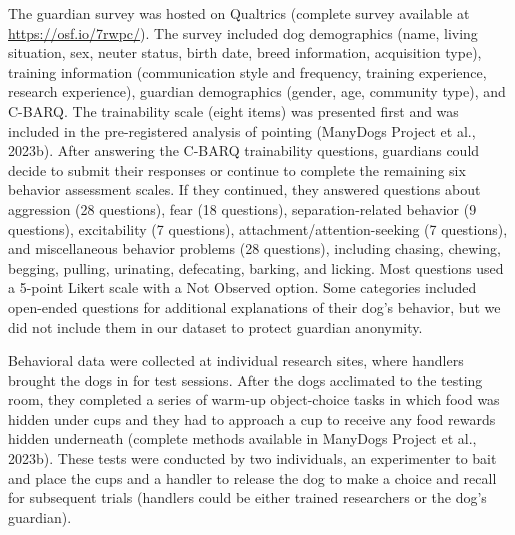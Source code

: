 \documentclass[
  man,floatsintext]{apa6}
\begin{document}
The guardian survey was hosted on Qualtrics (complete survey available at \url{https://osf.io/7rwpc/}). The survey included dog demographics (name, living situation, sex, neuter status, birth date, breed information, acquisition type), training information (communication style and frequency, training experience, research experience), guardian demographics (gender, age, community type), and C-BARQ. The trainability scale (eight items) was presented first and was included in the pre-registered analysis of pointing (ManyDogs Project et al., 2023b). After answering the C-BARQ trainability questions, guardians could decide to submit their responses or continue to complete the remaining six behavior assessment scales. If they continued, they answered questions about aggression (28 questions), fear (18 questions), separation-related behavior (9 questions), excitability (7 questions), attachment/attention-seeking (7 questions), and miscellaneous behavior problems (28 questions), including chasing, chewing, begging, pulling, urinating, defecating, barking, and licking. Most questions used a 5-point Likert scale with a Not Observed option. Some categories included open-ended questions for additional explanations of their dog's behavior, but we did not include them in our dataset to protect guardian anonymity.

Behavioral data were collected at individual research sites, where handlers brought the dogs in for test sessions. After the dogs acclimated to the testing room, they completed a series of warm-up object-choice tasks in which food was hidden under cups and they had to approach a cup to receive any food rewards hidden underneath (complete methods available in ManyDogs Project et al., 2023b). These tests were conducted by two individuals, an experimenter to bait and place the cups and a handler to release the dog to make a choice and recall for subsequent trials (handlers could be either trained researchers or the dog's guardian).
\end{document}
